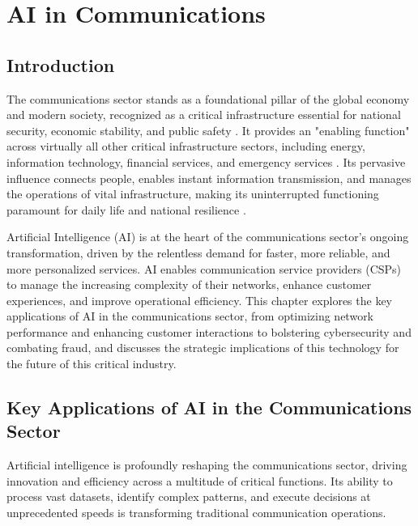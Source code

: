 \chapter{AI in Communications}
\label{cha:ai_in_communications}

\section{Introduction}

The communications sector stands as a foundational pillar of the global economy and modern society, recognized as a critical infrastructure essential for national security, economic stability, and public safety \cite{CISA_Communications_1, CISA_Communications_2}. It provides an "enabling function" across virtually all other critical infrastructure sectors, including energy, information technology, financial services, and emergency services \cite{CISA_Communications_3}. Its pervasive influence connects people, enables instant information transmission, and manages the operations of vital infrastructure, making its uninterrupted functioning paramount for daily life and national resilience \cite{GAO_Communications}.

Artificial Intelligence (AI) is at the heart of the communications sector's ongoing transformation, driven by the relentless demand for faster, more reliable, and more personalized services. AI enables communication service providers (CSPs) to manage the increasing complexity of their networks, enhance customer experiences, and improve operational efficiency. This chapter explores the key applications of AI in the communications sector, from optimizing network performance and enhancing customer interactions to bolstering cybersecurity and combating fraud, and discusses the strategic implications of this technology for the future of this critical industry.

\section{Key Applications of AI in the Communications Sector}

Artificial intelligence is profoundly reshaping the communications sector, driving innovation and efficiency across a multitude of critical functions. Its ability to process vast datasets, identify complex patterns, and execute decisions at unprecedented speeds is transforming traditional communication operations.

